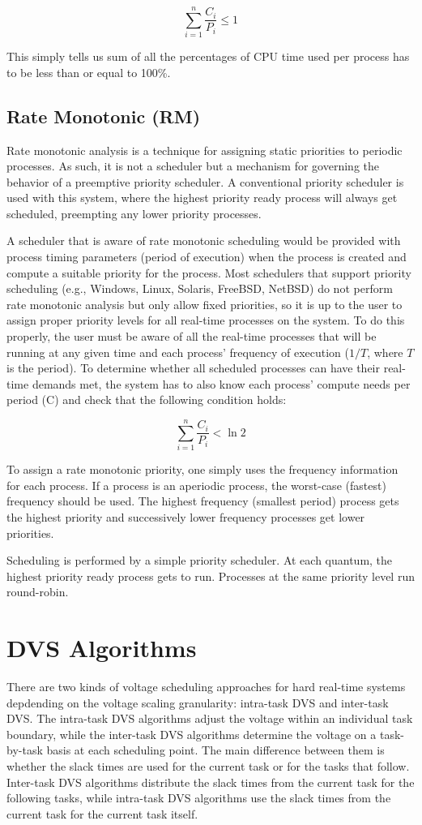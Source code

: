 \documentclass[10pt,article]{IEEEtran}
\begin{document}
$$\sum_{i = 1}^{n} \frac{C_i}{P_i} \leq 1$$

This simply tells us sum of all the percentages of CPU time used per process has to be less than or equal to 100\%. 

\subsection{Rate Monotonic (RM)}
 Rate monotonic analysis is a technique for assigning static priorities to periodic processes. As such, it is not a scheduler but a mechanism for governing the behavior of a preemptive priority scheduler. A conventional priority scheduler is used with this system, where the highest priority ready process will always get scheduled, preempting any lower priority processes.

A scheduler that is aware of rate monotonic scheduling would be provided with process timing parameters (period of execution) when the process is created and compute a suitable priority for the process. Most schedulers that support priority scheduling (e.g., Windows, Linux, Solaris, FreeBSD, NetBSD) do not perform rate monotonic analysis but only allow fixed priorities, so it is up to the user to assign proper priority levels for all real-time processes on the system. To do this properly, the user must be aware of all the real-time processes that will be running at any given time and each process' frequency of execution ($1/T$, where $T$ is the period). To determine whether all scheduled processes can have their real-time demands met, the system has to also know each process' compute needs per period (C) and check that the following condition holds: 

$$\sum_{i = 1}^{n} \frac{C_i}{P_i} < \ln 2$$

To assign a rate monotonic priority, one simply uses the frequency information for each process. If a process is an aperiodic process, the worst-case (fastest) frequency should be used. The highest frequency (smallest period) process gets the highest priority and successively lower frequency processes get lower priorities.

Scheduling is performed by a simple priority scheduler. At each quantum, the highest priority ready process gets to run. Processes at the same priority level run round-robin.

\section{DVS Algorithms} \label{sec:dvs-algs}
There are two kinds of voltage scheduling approaches for hard real-time systems depdending on the voltage scaling granularity: intra-task DVS and inter-task DVS. The intra-task DVS algorithms adjust the voltage within an individual task boundary, while the inter-task DVS algorithms determine the voltage on a task-by-task basis at each scheduling point. The main difference between them is whether the slack times are used for the current task or for the tasks that follow. Inter-task DVS algorithms distribute the slack times from the current task for the following tasks, while intra-task DVS algorithms use the slack times from the current task for the current task itself.
\end{document}
